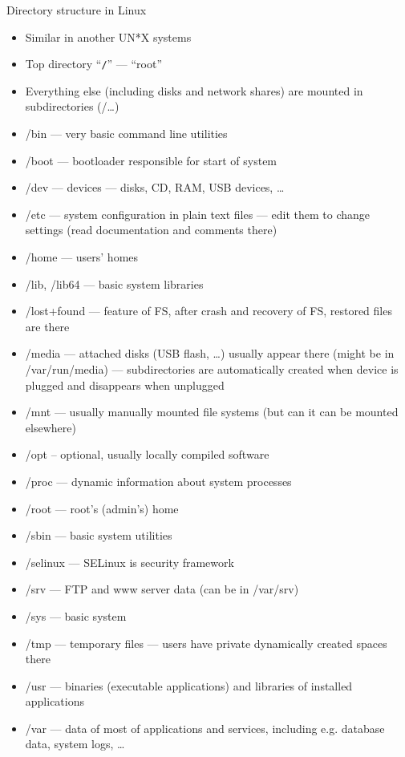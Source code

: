 \documentclass[hyperref={bookmarks=true, unicode=true, colorlinks=true, pdftitle={Linux, command line and MetaCentrum}, plainpages=false, pdfauthor={Vojtech Zeisek}, pdfsubject={Course about use of Linux command line, writing shell scripts and using MetaCentrum of CESNET}, pdfcreator={XeLaTeX, http://www.xelatex.org/}, pdfkeywords={Linux, GNU, BASH, shell, command line, MetaCentrum}, linkcolor=Sienna, anchorcolor=black, citecolor=green, filecolor=magenta, menucolor=Sienna, urlcolor=cyan, pdftex}, compress, ucs, xelatex, xcolor=svgnames, 11pt]{beamer}
\begin{document}
\begin{frame}[allowframebreaks]{Directory structure in Linux}
\begin{itemize}
  \item Similar in another UN*X systems
  \item Top directory ``\texttt{/}'' --- ``root''
  \item Everything else (including disks and network shares) are mounted in subdirectories (/\ldots)
  \item /bin --- very basic command line utilities
  \item /boot --- bootloader responsible for start of system
  \item /dev --- devices --- disks, CD, RAM, USB devices, \ldots
  \item \alert{/etc} --- system configuration in plain text files --- edit them to change settings (read documentation and comments there)
  \item \alert{/home} --- users' homes
  \item /lib, /lib64 --- basic system libraries
  \item /lost+found --- feature of FS, after crash and recovery of FS, restored files are there
  \item \alert{/media} --- attached disks (USB flash, \ldots) usually appear there (might be in /var/run/media) --- subdirectories are automatically created when device is plugged and disappears when unplugged
  \item /mnt --- usually manually mounted file systems (but can it can be mounted elsewhere)
  \item /opt -- optional, usually locally compiled software
  \item /proc --- dynamic information about system processes
  \item /root --- root's (admin's) home
  \item /sbin --- basic system utilities
  \item /selinux --- SELinux is security framework
  \item /srv --- FTP and www server data (can be in /var/srv)
  \item /sys --- basic system
  \item /tmp --- temporary files --- users have private dynamically created spaces there
  \item /usr --- binaries (executable applications) and libraries of installed applications
  \item \alert{/var} --- data of most of applications and services, including e.g. database data, system logs, \ldots

\end{itemize}
\end{frame}
\end{document}
